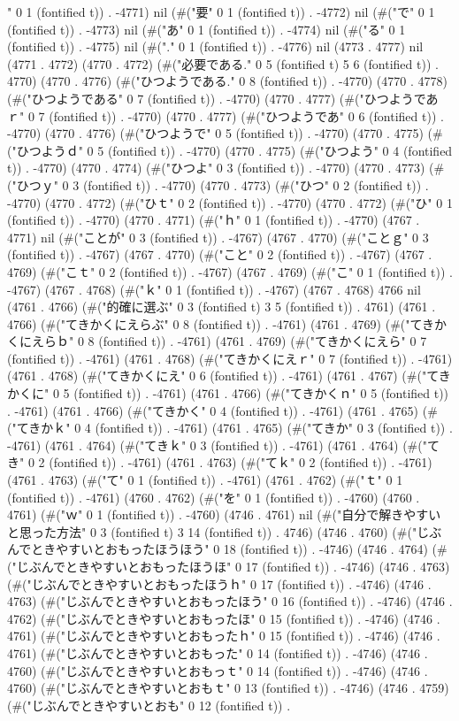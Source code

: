 " 0 1 (fontified t)) . -4771) nil (#("要" 0 1 (fontified t)) . -4772) nil (#("で" 0 1 (fontified t)) . -4773) nil (#("あ" 0 1 (fontified t)) . -4774) nil (#("る" 0 1 (fontified t)) . -4775) nil (#("." 0 1 (fontified t)) . -4776) nil (4773 . 4777) nil (4771 . 4772) (4770 . 4772) (#("必要である." 0 5 (fontified t) 5 6 (fontified t)) . 4770) (4770 . 4776) (#("ひつようである." 0 8 (fontified t)) . -4770) (4770 . 4778) (#("ひつようである" 0 7 (fontified t)) . -4770) (4770 . 4777) (#("ひつようであｒ" 0 7 (fontified t)) . -4770) (4770 . 4777) (#("ひつようであ" 0 6 (fontified t)) . -4770) (4770 . 4776) (#("ひつようで" 0 5 (fontified t)) . -4770) (4770 . 4775) (#("ひつようｄ" 0 5 (fontified t)) . -4770) (4770 . 4775) (#("ひつよう" 0 4 (fontified t)) . -4770) (4770 . 4774) (#("ひつよ" 0 3 (fontified t)) . -4770) (4770 . 4773) (#("ひつｙ" 0 3 (fontified t)) . -4770) (4770 . 4773) (#("ひつ" 0 2 (fontified t)) . -4770) (4770 . 4772) (#("ひｔ" 0 2 (fontified t)) . -4770) (4770 . 4772) (#("ひ" 0 1 (fontified t)) . -4770) (4770 . 4771) (#("ｈ" 0 1 (fontified t)) . -4770) (4767 . 4771) nil (#("ことが" 0 3 (fontified t)) . -4767) (4767 . 4770) (#("ことｇ" 0 3 (fontified t)) . -4767) (4767 . 4770) (#("こと" 0 2 (fontified t)) . -4767) (4767 . 4769) (#("こｔ" 0 2 (fontified t)) . -4767) (4767 . 4769) (#("こ" 0 1 (fontified t)) . -4767) (4767 . 4768) (#("ｋ" 0 1 (fontified t)) . -4767) (4767 . 4768) 4766 nil (4761 . 4766) (#("的確に選ぶ" 0 3 (fontified t) 3 5 (fontified t)) . 4761) (4761 . 4766) (#("てきかくにえらぶ" 0 8 (fontified t)) . -4761) (4761 . 4769) (#("てきかくにえらｂ" 0 8 (fontified t)) . -4761) (4761 . 4769) (#("てきかくにえら" 0 7 (fontified t)) . -4761) (4761 . 4768) (#("てきかくにえｒ" 0 7 (fontified t)) . -4761) (4761 . 4768) (#("てきかくにえ" 0 6 (fontified t)) . -4761) (4761 . 4767) (#("てきかくに" 0 5 (fontified t)) . -4761) (4761 . 4766) (#("てきかくｎ" 0 5 (fontified t)) . -4761) (4761 . 4766) (#("てきかく" 0 4 (fontified t)) . -4761) (4761 . 4765) (#("てきかｋ" 0 4 (fontified t)) . -4761) (4761 . 4765) (#("てきか" 0 3 (fontified t)) . -4761) (4761 . 4764) (#("てきｋ" 0 3 (fontified t)) . -4761) (4761 . 4764) (#("てき" 0 2 (fontified t)) . -4761) (4761 . 4763) (#("てｋ" 0 2 (fontified t)) . -4761) (4761 . 4763) (#("て" 0 1 (fontified t)) . -4761) (4761 . 4762) (#("ｔ" 0 1 (fontified t)) . -4761) (4760 . 4762) (#("を" 0 1 (fontified t)) . -4760) (4760 . 4761) (#("ｗ" 0 1 (fontified t)) . -4760) (4746 . 4761) nil (#("自分で解きやすいと思った方法" 0 3 (fontified t) 3 14 (fontified t)) . 4746) (4746 . 4760) (#("じぶんでときやすいとおもったほうほう" 0 18 (fontified t)) . -4746) (4746 . 4764) (#("じぶんでときやすいとおもったほうほ" 0 17 (fontified t)) . -4746) (4746 . 4763) (#("じぶんでときやすいとおもったほうｈ" 0 17 (fontified t)) . -4746) (4746 . 4763) (#("じぶんでときやすいとおもったほう" 0 16 (fontified t)) . -4746) (4746 . 4762) (#("じぶんでときやすいとおもったほ" 0 15 (fontified t)) . -4746) (4746 . 4761) (#("じぶんでときやすいとおもったｈ" 0 15 (fontified t)) . -4746) (4746 . 4761) (#("じぶんでときやすいとおもった" 0 14 (fontified t)) . -4746) (4746 . 4760) (#("じぶんでときやすいとおもっｔ" 0 14 (fontified t)) . -4746) (4746 . 4760) (#("じぶんでときやすいとおもｔ" 0 13 (fontified t)) . -4746) (4746 . 4759) (#("じぶんでときやすいとおも" 0 12 (fontified t)) . 